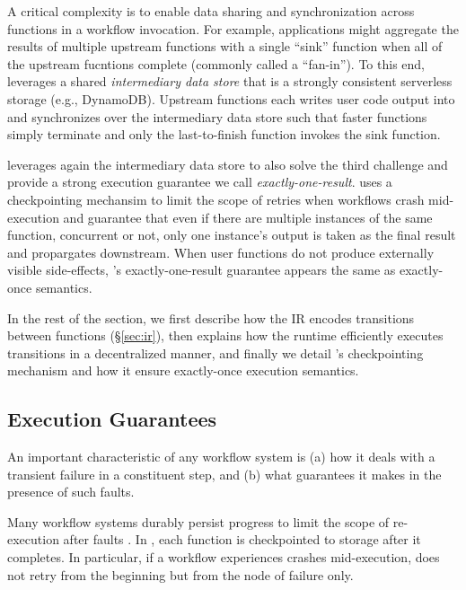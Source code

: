 A critical complexity is to enable data sharing and synchronization across
functions in a workflow invocation. For example, applications might aggregate
the results of multiple upstream functions with a single ``sink'' function
when all of the upstream fucntions complete (commonly called a ``fan-in''). To
this end, \name{} leverages a shared \emph{intermediary data store} that is a
strongly consistent serverless storage (e.g., DynamoDB). Upstream functions
each writes user code output into and synchronizes over the intermediary data
store such that faster functions simply terminate and only the last-to-finish
function invokes the sink function.

\name{} leverages again the intermediary data store to also solve the third
challenge and provide a strong execution guarantee we call
\emph{exactly-one-result}. \name{} uses a checkpointing mechansim to limit the
scope of retries when workflows crash mid-execution and guarantee that even if
there are multiple instances of the same function, concurrent or not, only one
instance's output is taken as the final result and propargates downstream.
When user functions do not produce externally visible side-effects, \name{}'s
exactly-one-result guarantee appears the same as exactly-once semantics.

In the rest of the section, we first describe how the \name{} IR encodes
transitions between functions (\S\ref{sec:ir}), then explains how the \name{}
runtime efficiently executes transitions in a decentralized manner, and
finally we detail \name{}'s checkpointing mechanism and how it ensure
exactly-once execution semantics.








\subsection{Execution Guarantees}\label{sec:exec-gntee}

An important characteristic of any workflow system is (a) how it deals with  a
transient failure in a constituent step, and (b) what guarantees it makes in
the presence of such faults.
 
Many workflow systems durably persist progress to limit the scope of re-execution after faults
\cite{aws-step-functions, durable-functions, netherite, google-workflows, kappa}.
In \name{}, each function is checkpointed to storage after it
completes. In particular, if a workflow experiences crashes mid-execution,
\name{} does not retry from the beginning but from the node of failure only.

